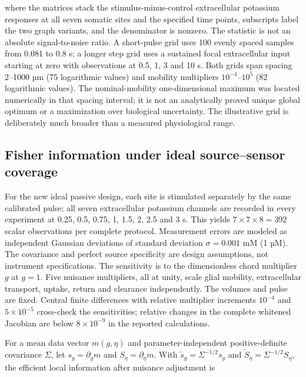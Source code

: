 \documentclass[
  11pt,
]{article}
\begin{document}
where the matrices stack the stimulus-minus-control extracellular
potassium responses at all seven somatic sites and the specified time
points, subscripts label the two graph variants, and the denominator is
nonzero. The statistic is not an absolute signal-to-noise ratio. A
short-pulse grid uses 100 evenly spaced samples from 0.081 to 0.8 s; a
longer step grid uses a sustained focal extracellular input starting at
zero with observations at 0.5, 1, 3 and 10 s. Both grids span spacing
2--1000 µm (75 logarithmic values) and mobility multipliers
\(10^{-4}\)--\(10^5\) (82 logarithmic values). The nominal-mobility
one-dimensional maximum was located numerically in that spacing
interval; it is not an analytically proved unique global optimum or a
maximization over biological uncertainty. The illustrative grid is
deliberately much broader than a measured physiological range.

\subsection{Fisher information under ideal source--sensor
coverage}\label{fisher-information-under-ideal-sourcesensor-coverage}

For the new ideal passive design, each site is stimulated separately by
the same calibrated pulse; all seven extracellular potassium channels
are recorded in every experiment at 0.25, 0.5, 0.75, 1, 1.5, 2, 2.5 and
3 s. This yields \(7\times7\times8=392\) scalar observations per
complete protocol. Measurement errors are modeled as independent
Gaussian deviations of standard deviation \(\sigma=0.001\) mM (1 µM).
The covariance and perfect source specificity are design assumptions,
not instrument specifications. The sensitivity is to the dimensionless
chord multiplier \(g\) at \(g=1\). Five nuisance multipliers, all at
unity, scale glial mobility, extracellular transport, uptake, return and
clearance independently. The volumes and pulse are fixed. Central finite
differences with relative multiplier increments \(10^{-4}\) and
\(5\times10^{-5}\) cross-check the sensitivities; relative changes in
the complete whitened Jacobian are below \(8\times10^{-9}\) in the
reported calculations.

For a mean data vector \(m(g,\eta)\) and parameter-independent
positive-definite covariance \(\Sigma\), let \(s_g=\partial_g m\) and
\(S_\eta=\partial_\eta m\). With \(\widetilde s_g=\Sigma^{-1/2}s_g\) and
\(\widetilde S_\eta=\Sigma^{-1/2}S_\eta\), the efficient local
information after nuisance adjustment is
\end{document}
